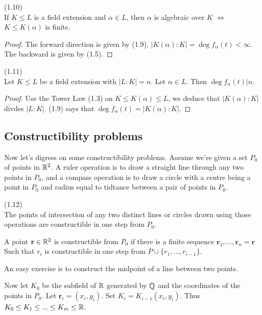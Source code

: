\documentclass[a4paper]{article}
\begin{document}
\begin{coro} (1.10)\\
If $K \leq L$ is a field extension and $\alpha \in L$, then $\alpha$ is algebraic over $K$ $\iff$ $K \leq K(\alpha)$ is finite.
\begin{proof}
The forward direction is given by (1.9), $|K(\alpha):K| = \deg f_\alpha(t) < \infty$. The backward is given by (1.5).
\end{proof}
\end{coro}

\begin{coro} (1.11)\\
Let $K \leq L$ be a field extension with $|L:K|=n$. Let $\alpha \in L$. Then $\deg f_\alpha(t) | n$.
\begin{proof}
Use the Tower Law (1.3) on $K \leq K(\alpha) \leq L$, we deduce that $|K(\alpha) : K| $ divdes $|L:K|$. (1.9) says that $\deg f_\alpha(t) = |K(\alpha):K|$.
\end{proof}
\end{coro}

\subsection{Constructibility problems}
Now let's digress on some constructibility problems. Assume we're given a set $P_0$ of points in $\mathbb{R}^2$. A ruler operation is to draw a straight line through any two points in $P_0$, and a compass operation is to draw a circle with a centre being a point in $P_0$ and radius equal to tidtance between a pair of points in $P_0$.

\begin{defi} (1.12)\\
The points of intersection of any two distinct lines or circles drawn using those operations are constructible in one step from $P_0$.

A point $\mathbf{r} \in \mathbb{R}^2$ is constructible from $P_0$ if there is a finite sequence $\mathbf{r}_1,...,\mathbf{r}_n = \mathbf{r}$ Such that $r_i$ is constructible in one step from $P \cup \{r_1,...,r_{i-1}\}$.
\end{defi}

An easy exercise is to construct the midpoint of a line between two points.

Now let $K_0$ be the subfield of $\mathbb{R}$ generated by $\mathbb{Q}$ and the coordinates of the points in $P_0$. Let $\mathbf{r}_i = (x_i,y_i)$. Set $K_i = K_{i-1} (x_i,y_i)$. Thus $K_0 \leq K_1 \leq ... \leq K_m \leq \mathbb{R}$.
\end{document}
